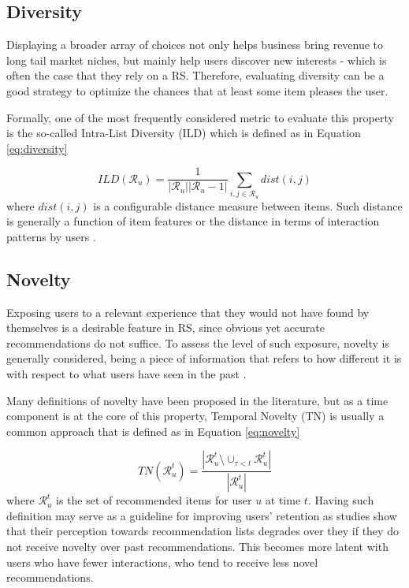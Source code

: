 \subsection{Diversity}


Displaying a broader array of choices not only helps business bring revenue to long tail market niches, but mainly help users discover new interests - which is often the case that they rely on a RS. Therefore, evaluating diversity can be a good strategy to optimize the chances that at least some item pleases the user.

Formally, one of the most frequently considered metric to evaluate this property is the so-called Intra-List Diversity (ILD)  \cite{2001SimilarityDiversity} which is defined as in Equation \ref{eq:diversity}

\begin{equation}
    \label{eq:diversity}
    ILD (\mathcal{R}_u) = \frac{1}{|\mathcal{R}_u||\mathcal{R}_u-1|} \sum_{i, j \in \mathcal{R}_u} dist(i,j)
\end{equation} where $dist(i,j)$ is a configurable distance measure between items. Such distance is generally a function of item features \cite{10.1145/1060745.1060754} or the distance in terms of interaction patterns by users \cite{2014NoveltyDiversityEnhancement}.


\subsection{Novelty}

Exposing users to a relevant experience that they would not have found by themselves is a desirable feature in RS, since obvious yet accurate recommendations do not suffice. To assess the level of such exposure, novelty is generally considered, being a piece of information that refers to how different it is with respect to what users have seen in the past \cite{2011RankNoveltyDiversity}. 

Many definitions of novelty have been proposed in the literature, but as a time component is at the core of this property, Temporal Novelty (TN)  is usually a common approach that is defined as in Equation \ref{eq:novelty}

\begin{equation}
\label{eq:novelty}
    TN(\mathcal{R}^t_u) = \frac{|\mathcal{R}^t_u \setminus \cup_{\tau < t} \mathcal{R}^t_u|}{|\mathcal{R}^t_u|}
\end{equation} where $\mathcal{R}^t_u$ is the set of recommended items for user $u$ at time $t$. Having such definition may serve as a guideline for improving users' retention as studies show that their perception towards recommendation lists degrades over they if they do not receive novelty over past recommendations. This becomes more latent with users who have fewer interactions, who tend to receive less novel recommendations.

